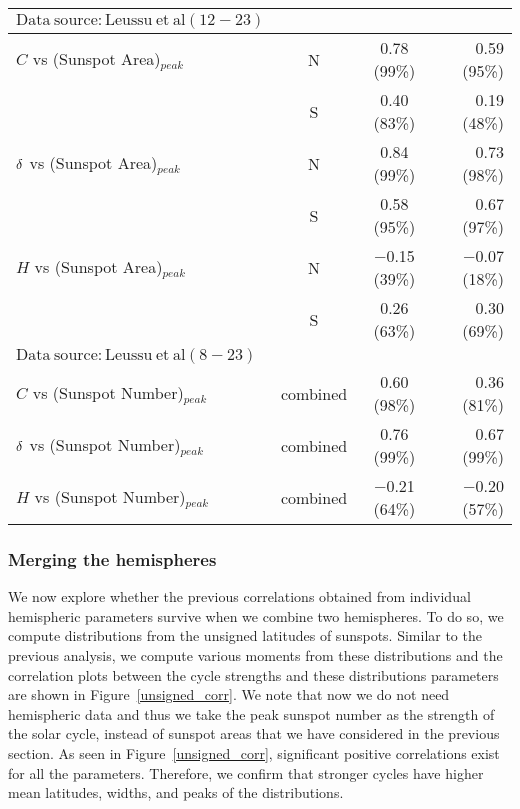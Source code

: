 \documentclass[preprint2,times,tighten]{aastex61}
\newcommand{\Fig}[1]{Figure~\ref{#1}}
\begin{document}
\begin{table*}
\begin{center}
\begin{tabular}{lccr}
  \hline
       \textbf{$\mathrm{Data~source: Leussu~et~al (12-23)}$}&  &   &  \\
     \hline
       $C$ vs (Sunspot Area)$_{peak}$& N & 0.78 (99\%) &  0.59 (95\%)\\
                                          & S & 0.40 (83\%) &  0.19 (48\%)\\
  $\rm{\delta}$ vs (Sunspot Area)$_{peak}$& N & 0.84 (99\%) &  0.73 (98\%)\\
                                          & S & 0.58 (95\%) &  0.67 (97\%)\\
  $H$ vs (Sunspot Area)$_{peak}$ & N & $-$0.15 (39\%)  &  $-$0.07 (18\%)\\
                                          & S & 0.26 (63\%)  &  0.30 (69\%)\\
  \hline
       \textbf{$\mathrm{Data~source: Leussu~et~al (8-23)}$}&  &   &  \\
     \hline
  $C$ vs (Sunspot Number)$_{peak}$& combined & 0.60 (98\%) &  0.36 (81\%)\\
$\rm{\delta}$ vs (Sunspot Number)$_{peak}$& combined & 0.76 (99\%) &  0.67 (99\%)\\
$H$ vs (Sunspot Number)$_{peak}$& combined & $-$0.21 (64\%) & $-$0.20 (57\%)\\
  \hline
\end{tabular}
\end{center}
\end{table*}


\subsubsection{Merging the hemispheres}
We now explore whether the previous correlations obtained
from individual hemispheric parameters survive when we combine two hemispheres.
To do so, we compute distributions from the unsigned latitudes of sunspots. 
Similar to the previous analysis, we compute various moments from these distributions
and the correlation plots between the cycle strengths and these distributions parameters are 
 shown in \Fig{unsigned_corr}. We note that now we do not need hemispheric data 
and thus we take the peak sunspot number as the strength of the solar cycle, 
instead of sunspot areas that we have considered in the previous section. 
As seen in \Fig{unsigned_corr}, significant  positive correlations exist for all the parameters.
Therefore, we confirm that stronger cycles have higher mean latitudes, 
widths, and peaks of the distributions.
\end{document}
